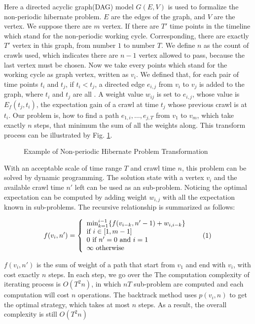 \documentclass[conference]{IEEEtran}
\newcommand\numberthis{\addtocounter{equation}{1}\tag{\theequation}}
\begin{document}
Here a directed acyclic graph(DAG) model $G(E,V)$ is used to formalize the non-periodic hibernate problem.
$E$ are the edges of the graph, and $V$ are the vertex. We suppose there are $m$ vertex. 
If there are $T'$ time points in the timeline which stand for the non-periodic working cycle. Corresponding, there are exactly $T'$ vertex in this graph, from number $1$ to number $T$. 
We define $n$ as the count of crawls used, which indicates there are $n-1$ vertex allowed to pass, because the last vertex must be chosen. 
Now we take every points which stand for the working cycle as graph vertex, written as $v_i$. We defined that, for each pair of time points $t_i$ and $t_j$, if $t_i<t_j$, a directed edge $e_{i,j}$ from $v_i$ to $v_j$ is added to the graph, where $t_i$ and $t_j$ are all . A weight value $w_{ij}$ is set to $e_{i,j}$, whose value is $E_f(t_j, t_i)$, the expectation gain of a crawl at time $t_j$ whose previous crawl is at $t_i$.
Our problem is, how to find a path $e_{1,i},\ldots,e_{j,T}$ from $v_1$ to $v_m$, which take exactly $n$ steps, that minimum the sum of all the weights along. This transform process can be illustrated by Fig. \ref{fig:problemtrans}.

\begin{figure}
	\centering
	
	\captionsetup{justification=centering}
	\caption{Example of Non-periodic Hibernate Problem Transformation}
	\label{fig:problemtrans}
\end{figure}


With an acceptable scale of time range $T$ and crawl time $n$, this problem can be solved by dynamic programming. The solution state with a vertex $v_i$ and the available crawl time $n'$ left can be used as an sub-problem. Noticing the optimal expectation can be computed by adding weight $w_{i,j}$ with all the expectation known in sub-problems. The recursive relationship is summarized as follows:

\[f(v_i, n')=\left\{
\begin{array}{lr}
\min_{k=1}^{i-1}\{f(v_{i-k}, n'-1)+w_{i,i-k}\}\\
\text{if }i\in[1, m-1]\\
0\text{ if }n'=0\text{ and }i=1\\
\infty\text{ otherwise}
\end{array}\numberthis \label{dp}
\right.
\]


$f(v_i,n')$ is the sum of weight of a path that start from $v_1$ and end with $v_i$, with cost exactly $n$ steps. In each step, we go over the  The computation complexity of iterating process is $O(T^2n)$, in which $nT$ sub-problem are computed and each computation will cost $n$ operations. The backtrack method uses $p(v_i, n)$ to get the optimal strategy, which takes at most $n$ steps. As a result, the overall complexity is still $O(T^2n)$ 
\end{document}
